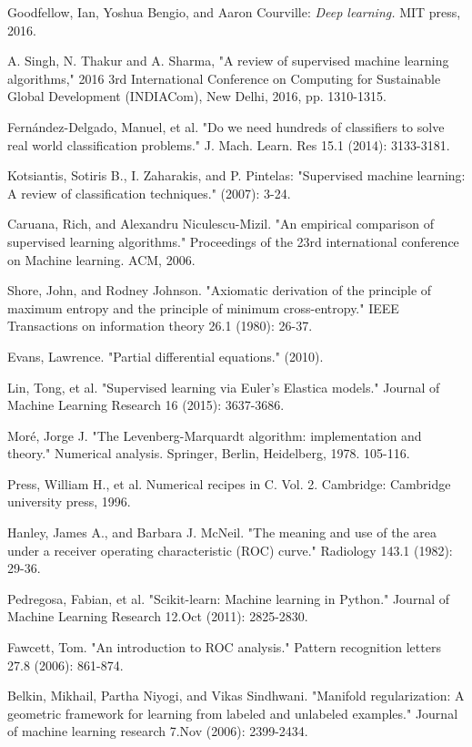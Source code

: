 \documentclass{INGUADY}
\begin{document}
\begin{thebibliography}{5} 

Goodfellow, Ian, Yoshua Bengio, and Aaron Courville:
\textit{Deep learning.} MIT press, 2016.

A. Singh, N. Thakur and A. Sharma, "A review of supervised machine learning algorithms," 2016 3rd International Conference on Computing for Sustainable Global Development (INDIACom), New Delhi, 2016, pp. 1310-1315.

Fernández-Delgado, Manuel, et al. "Do we need hundreds of classifiers to solve real world classification problems." J. Mach. Learn. Res 15.1 (2014): 3133-3181.

Kotsiantis, Sotiris B., I. Zaharakis, and P. Pintelas: 
"Supervised machine learning: A review of classification techniques." (2007): 3-24.

Caruana, Rich, and Alexandru Niculescu-Mizil. "An empirical comparison of supervised learning algorithms." Proceedings of the 23rd international conference on Machine learning. ACM, 2006.

Shore, John, and Rodney Johnson. "Axiomatic derivation of the principle of maximum entropy and the principle of minimum cross-entropy." IEEE Transactions on information theory 26.1 (1980): 26-37.

Evans, Lawrence. "Partial differential equations." (2010).

Lin, Tong, et al. "Supervised learning via Euler's Elastica models." Journal of Machine Learning Research 16 (2015): 3637-3686.

Moré, Jorge J. "The Levenberg-Marquardt algorithm: implementation and theory." Numerical analysis. Springer, Berlin, Heidelberg, 1978. 105-116.

Press, William H., et al. Numerical recipes in C. Vol. 2. Cambridge: Cambridge university press, 1996.

Hanley, James A., and Barbara J. McNeil. "The meaning and use of the area under a receiver operating characteristic (ROC) curve." Radiology 143.1 (1982): 29-36.

Pedregosa, Fabian, et al. "Scikit-learn: Machine learning in Python." Journal of Machine Learning Research 12.Oct (2011): 2825-2830.

Fawcett, Tom. "An introduction to ROC analysis." Pattern recognition letters 27.8 (2006): 861-874.

Belkin, Mikhail, Partha Niyogi, and Vikas Sindhwani. "Manifold regularization: A geometric framework for learning from labeled and unlabeled examples." Journal of machine learning research 7.Nov (2006): 2399-2434.

\end{thebibliography}
\end{document}
